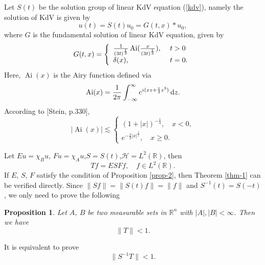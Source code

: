 \documentclass[12pt]{amsart}
\def\R {\mathbb{R}}
\def\d{{\,\rm d}}
\newtheorem{proposition}{Proposition}[section]
\theoremstyle{definition}
\numberwithin{equation}{section}
\begin{document}
Let $S(t)$ be the solution group of linear KdV equation (\ref{kdv}), namely the solution of KdV is given by
$$
u(t)=S(t)u_0=G(t,x)*u_0,
$$
where $G$ is the fundamental solution of linear KdV equation, given by
\begin{align*}
    G(t,x)= \left\{
        \begin{array}{ll}
        \frac{1}{(3t)^{\frac{1}{3}}}\operatorname{Ai}(\frac{x}{(3t)^{\frac{1}{3}}}), & \hbox{ }t>0 \\
        \delta(x), & \hbox{ }t=0.
        \end{array}
        \right.
\end{align*}
Here, $\operatorname{Ai}(x)$ is the Airy function defined via
\begin{align*}
\operatorname{Ai}(x)= \frac{1}{2\pi}\int^{\infty}_{-\infty}e^{i(xz+\frac{1}{3}z^3)}\d z.
\end{align*}
According to [Stein, p.330],
$$|\operatorname{Ai}(x)| \lesssim
\begin{cases}
(1+|x|)^{-\frac{1}{4}}, \quad x<0, \\
 e^{-\frac{2}{3}|x|^{\frac{3}{2}}}, \quad x\geq 0.
\end{cases}
$$

Let $Eu=\chi_B u$, $Fu=\chi_A u$,$S=S(t)$,$\mathcal{H}=L^2(\R)$, then 
$$
Tf=ESFf, \quad f\in L^2(\R).
$$
If $E$, $S$, $F$ satisfy the condition of Proposition \ref{prop-2}, then Theorem \ref{thm-1} can be verified directly. Since $\| Sf\|=\|S(t)f\|=\|f\|$ and $S^{-1}(t)=S(-t)$, we only need to prove the following      

\begin{proposition}\label{prop-3}
    Let $A$, $B$ be two measurable sets in $\R^n$ with $|A|,|B|<\infty$. Then we have 
    $$
        \|T\|<1.
    $$      
\end{proposition}

    It is equivalent to prove 
    $$
        \|S^{-1}T\|<1.
    $$
\end{document}
